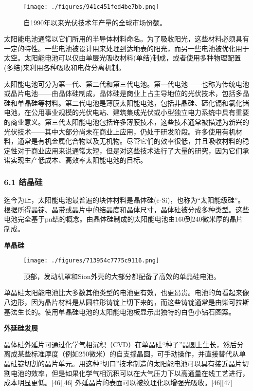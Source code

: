 \begin{figure}[ht]
\centering
\texttt{[image: ./figures/941c451fed4be7bb.png]}
\caption{自1990年以来光伏技术年产量的全球市场份额。} \label{fig_TYNDC_8}
\end{figure}

太阳能电池通常以它们所用的半导体材料命名。为了吸收阳光，这些材料必须具有一定的特性。一些电池被设计用来处理到达地表的阳光，而另一些电池被优化用于太空。太阳能电池可以仅由单层光吸收材料(单结)制成，或者使用多种物理配置(多结)来利用各种吸收和电荷分离机制。

太阳能电池可分为第一代、第二代和第三代电池。第一代电池——也称为传统电池或晶片电池——由晶体硅制成，晶体硅是商业上占主导地位的光伏技术，包括多晶硅和单晶硅等材料。第二代电池是薄膜太阳能电池，包括非晶硅、碲化镉和氯化锗电池，在公用事业规模的光伏电站、建筑集成光伏或小型独立电力系统中具有重要的商业意义。第三代太阳能电池包括许多薄膜技术，这些技术通常被描述为新兴的光伏技术——其中大部分尚未在商业上应用，仍处于研发阶段。许多使用有机材料，通常是有机金属化合物以及无机物。尽管它们的效率很低，并且吸收材料的稳定性对于商业应用来说通常太短，但是对这些技术进行了大量的研究，因为它们承诺实现生产低成本、高效率太阳能电池的目标。

\subsubsection{6.1 结晶硅}

迄今为止，太阳能电池最普遍的块体材料是晶体硅(c-Si)，也称为“太阳能级硅”。根据所得晶锭、晶带或晶片中的结晶度和晶体尺寸，晶体硅被分成多种类型。这些电池完全基于pn结的概念。由晶体硅制成的太阳能电池由160到240微米厚的晶片制成。

\textbf{单晶硅}

\begin{figure}[ht]
\centering
\texttt{[image: ./figures/713954c7775c9116.png]}
\caption{顶部，发动机罩和Sion外壳的大部分都配备了高效的单晶硅电池。} \label{fig_TYNDC_7}
\end{figure}

单晶硅太阳能电池比大多数其他类型的电池更有效，也更昂贵。电池的角看起来像八边形，因为晶片材料是从圆柱形铸锭上切下来的，而这些铸锭通常是由柴可拉斯基法生长的。使用单晶硅电池的太阳能电池板显示出独特的白色小钻石图案。

\textbf{外延硅发展}

晶体硅外延片可通过化学气相沉积（CVD）在单晶硅“种子”晶圆上生长，然后分离成某些标准厚度（例如250微米）的自支撑晶圆，可手动操作，并直接替代从单晶硅锭切割的晶片单元。用这种“切口”技术制造的太阳能电池可以具有接近晶片切割电池的效率，但是如果化学气相沉积可以在大气压力下以高通量在线工艺进行，成本明显更低。[46][46] 外延晶片的表面可以被纹理化以增强光吸收。[46][47]

